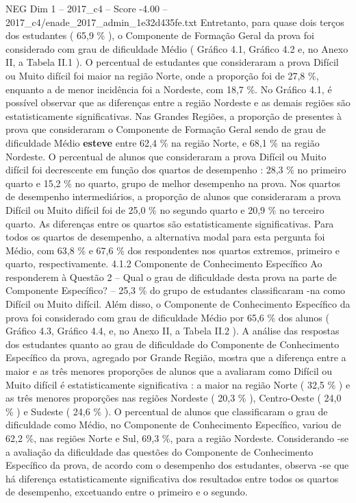 \begin{textsample}{NEG Dim 1 – 2017\_c4 – Score -4.00 – 2017\_c4/enade\_2017\_admin\_1e32d435fe.txt}
Entretanto, para quase dois terços dos estudantes ( 65,9 \% ), o Componente de Formação Geral da prova foi considerado com grau de dificuldade Médio ( Gráfico 4.1, Gráfico 4.2 e, no Anexo II, a Tabela II.1 ).
O percentual de estudantes que consideraram a prova Difícil ou Muito difícil foi maior na região Norte, onde a proporção foi de 27,8 \%, enquanto a de menor incidência foi a Nordeste, com 18,7 \%.
No Gráfico 4.1, é possível observar que as diferenças entre a região Nordeste e as demais regiões são estatisticamente significativas.
Nas Grandes Regiões, a proporção de presentes à prova que consideraram o Componente de Formação Geral sendo de grau de dificuldade Médio \textbf{esteve} entre 62,4 \% na região Norte, e 68,1 \% na região Nordeste.
O percentual de alunos que consideraram a prova Difícil ou Muito difícil foi decrescente em função dos quartos de desempenho : 28,3 \% no primeiro quarto e 15,2 \% no quarto, grupo de melhor desempenho na prova.
Nos quartos de desempenho intermediários, a proporção de alunos que consideraram a prova Difícil ou Muito difícil foi de 25,0 \% no segundo quarto e 20,9 \% no terceiro quarto.
As diferenças entre os quartos são estatisticamente significativas.
Para todos os quartos de desempenho, a alternativa modal para esta pergunta foi Médio, com 63,8 \% e 67,6 \% dos respondentes nos quartos extremos, primeiro e quarto, respectivamente. 4.1.2 Componente de Conhecimento Específico Ao responderem à Questão 2 – Qual o grau de dificuldade desta prova na parte de Componente Específico? – 25,3 \% do grupo de estudantes classificaram -na como Difícil ou Muito difícil.
Além disso, o Componente de Conhecimento Específico da prova foi considerado com grau de dificuldade Médio por 65,6 \% dos alunos ( Gráfico 4.3, Gráfico 4.4, e, no Anexo II, a Tabela II.2 ).
A análise das respostas dos estudantes quanto ao grau de dificuldade do Componente de Conhecimento Específico da prova, agregado por Grande Região, mostra que a diferença entre a maior e as três menores proporções de alunos que a avaliaram como Difícil ou Muito difícil é estatisticamente significativa : a maior na região Norte ( 32,5 \% ) e as três menores proporções nas regiões Nordeste ( 20,3 \% ), Centro-Oeste ( 24,0 \% ) e Sudeste ( 24,6 \% ).
O percentual de alunos que classificaram o grau de dificuldade como Médio, no Componente de Conhecimento Específico, variou de 62,2 \%, nas regiões Norte e Sul, 69,3 \%, para a região Nordeste.
Considerando -se a avaliação da dificuldade das questões do Componente de Conhecimento Específico da prova, de acordo com o desempenho dos estudantes, observa -se que há diferença estatisticamente significativa dos resultados entre todos os quartos de desempenho, excetuando entre o primeiro e o segundo.

\end{textsample}
